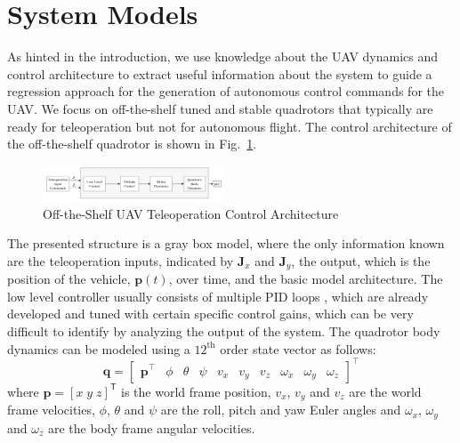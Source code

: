 \documentclass[letterpaper, 10 pt, conference]{ieeeconf}  %
\newcommand\NB[1]{$\spadesuit$\footnote{NB: #1}}
\begin{document}
\section{System Models} \label{sec:sysdyn}
As hinted in the introduction, we use knowledge about the UAV dynamics and control architecture to extract useful information about the system to guide a regression approach for the generation of autonomous control commands for the UAV. We focus on off-the-shelf tuned and stable quadrotors that typically are ready for teleoperation but not for autonomous flight. The control architecture of the off-the-shelf quadrotor is shown in Fig.~\ref{fig:otsctrl}.
\begin{figure}[ht]
    \includegraphics[width=0.48\textwidth]{images/teleopctrl.png}
    \caption{Off-the-Shelf UAV Teleoperation Control Architecture}
    \label{fig:otsctrl}
\end{figure}
The presented structure is a gray box model, where the only information known are the teleoperation inputs, indicated by $\bm{J}_x$ and $\bm{J}_y$, the output, which is the position of the vehicle, $\bm{p}(t)$, over time, and the basic model architecture. The low level controller usually consists of multiple PID loops \cite{esen}, which are already developed and tuned with certain specific control gains, which can be very difficult to identify by analyzing the output of the system. The quadrotor body dynamics can be modeled using a $12^{\text{th}}$ order state vector as follows:
\begin{equation}
    \bm{q} = 
    \begin{bmatrix}
    \bm{p}^\intercal & \phi & \theta & \psi & v_x & v_y & v_z & \omega_x & \omega_y & \omega_z
    \end{bmatrix}^\intercal \nonumber
\end{equation} 
where $\bm{p}=[x \; y \; z]^{\mathsf{T}}$ is the world frame position, $v_{x}$, $v_{y}$ and $v_z$ are the world frame velocities, $\phi$, $\theta$ and $\psi$ are the roll, pitch and yaw Euler angles and $\omega_{x}$, $\omega_{y}$ and $\omega_{z}$ are the body frame angular velocities.
\end{document}
